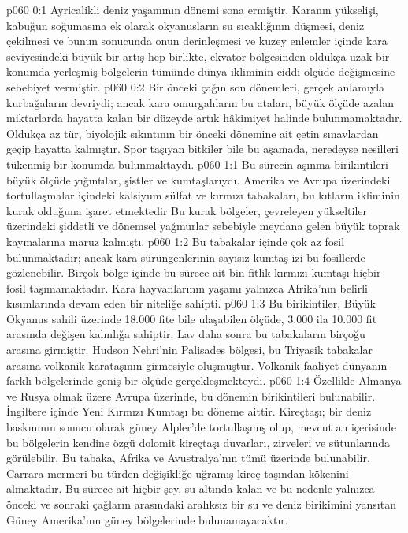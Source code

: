 \vs p060 0:1 Ayricalikli deniz yaşamının dönemi sona ermiştir. Karanın yükselişi, kabuğun soğumasına ek olarak okyanusların su sıcaklığının düşmesi, deniz çekilmesi ve bunun sonucunda onun derinleşmesi ve kuzey enlemler içinde kara seviyesindeki büyük bir artış hep birlikte, ekvator bölgesinden oldukça uzak bir konumda yerleşmiş bölgelerin tümünde dünya ikliminin ciddi ölçüde değişmesine sebebiyet vermiştir.
\vs p060 0:2 Bir önceki çağın son dönemleri, gerçek anlamıyla kurbağaların devriydi; ancak kara omurgalıların bu ataları, büyük ölçüde azalan miktarlarda hayatta kalan bir düzeyde artık hâkimiyet halinde bulunmamaktadır. Oldukça az tür, biyolojik sıkıntının bir önceki dönemine ait çetin sınavlardan geçip hayatta kalmıştır. Spor taşıyan bitkiler bile bu aşamada, neredeyse nesilleri tükenmiş bir konumda bulunmaktaydı.
\vs p060 1:1 Bu sürecin aşınma birikintileri büyük ölçüde yığıntılar, şistler ve kumtaşlarıydı. Amerika ve Avrupa üzerindeki tortullaşmalar içindeki kalsiyum sülfat ve kırmızı tabakaları, bu kıtların ikliminin kurak olduğuna işaret etmektedir Bu kurak bölgeler, çevreleyen yükseltiler üzerindeki şiddetli ve dönemsel yağmurlar sebebiyle meydana gelen büyük toprak kaymalarına maruz kalmıştı.
\vs p060 1:2 Bu tabakalar içinde çok az fosil bulunmaktadır; ancak kara sürüngenlerinin sayısız kumtaş izi bu fosillerde gözlenebilir. Birçok bölge içinde bu sürece ait bin fitlik kırmızı kumtaşı hiçbir fosil taşımamaktadır. Kara hayvanlarının yaşamı yalnızca Afrika’nın belirli kısımlarında devam eden bir niteliğe sahipti.
\vs p060 1:3 Bu birikintiler, Büyük Okyanus sahili üzerinde 18.000 fite bile ulaşabilen ölçüde, 3.000 ila 10.000 fit arasında değişen kalınlığa sahiptir. Lav daha sonra bu tabakaların birçoğu arasına girmiştir. Hudson Nehri’nin Palisades bölgesi, bu Triyasik tabakalar arasına volkanik karataşının girmesiyle oluşmuştur. Volkanik faaliyet dünyanın farklı bölgelerinde geniş bir ölçüde gerçekleşmekteydi.
\vs p060 1:4 Özellikle Almanya ve Rusya olmak üzere Avrupa üzerinde, bu dönemin birikintileri bulunabilir. İngiltere içinde Yeni Kırmızı Kumtaşı bu döneme aittir. Kireçtaşı; bir deniz baskınının sonucu olarak güney Alpler’de tortullaşmış olup, mevcut an içerisinde bu bölgelerin kendine özgü dolomit kireçtaşı duvarları, zirveleri ve sütunlarında görülebilir. Bu tabaka, Afrika ve Avustralya’nın tümü üzerinde bulunabilir. Carrara mermeri bu türden değişikliğe uğramış kireç taşından kökenini almaktadır. Bu sürece ait hiçbir şey, su altında kalan ve bu nedenle yalnızca önceki ve sonraki çağların arasındaki aralıksız bir su ve deniz birikimini yansıtan Güney Amerika’nın güney bölgelerinde bulunamayacaktır.
